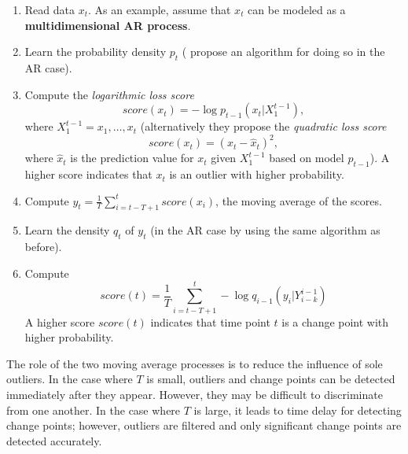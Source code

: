 \documentclass[conference,letterpaper]{IEEEtran}
\begin{document}
\begin{enumerate}
\item Read data $x_t$. As an example, \cite{TAYA} assume that $x_t$ can be modeled as a {\bf multidimensional AR process}.
\item Learn the probability density $p_t$ (\cite{TAYA} propose an algorithm for doing so in the AR case).
\item Compute the \emph{logarithmic loss score} 
\[score(x_t)=-\log p_{t-1}(x_t|X_1^{t-1}), \]
where $X_1^{t-1}=x_1,\ldots,x_t$ (alternatively they propose the \emph{quadratic loss score} 
\[score(x_t)=\left( x_t-\hat{x}_t\right)^2, \]
where $\hat{x}_t$ is  the prediction value for $x_t$ given $X_1^{t-1}$ based on model $p_{t-1}$). A higher score indicates that $x_t$ is an outlier with higher probability. 
\item Compute $y_t=\frac{1}{T} \sum_{i=t-T+1}^t score(x_i)$, the moving average of the scores.
\item Learn the density $q_t$ of $y_t$ (in the AR case by using the same algorithm as before).
\item Compute $$score(t)=\frac{1}{T}\sum_{i=t-T+1}^t -\log q_{i-1}(y_i|Y_{i-k}^{i-1})$$ A higher score $score(t)$ indicates that time point $t$ is a change point with higher probability. 
\end{enumerate}

The role of the two moving average processes is to reduce the influence of sole outliers. In the case where $T$
is small, outliers and change points can be detected immediately after they appear. However, they may be difficult to discriminate from one another. In the case where $T$ is large, it leads to time delay for detecting change points; however, outliers are filtered and only significant change points are detected accurately.
\end{document}
